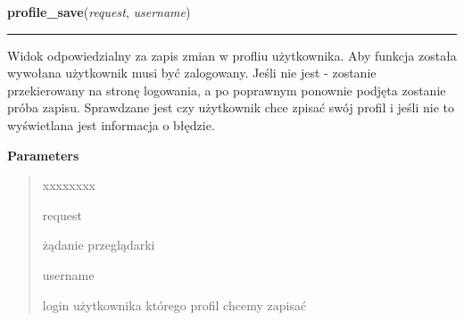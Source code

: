 \hspace{.8\funcindent}\begin{boxedminipage}{\funcwidth}

    \raggedright \textbf{profile\_save}(\textit{request}, \textit{username})

    \vspace{-1.5ex}

    \rule{\textwidth}{0.5\fboxrule}
\setlength{\parskip}{2ex}
    Widok odpowiedzialny za zapis zmian w profliu użytkownika. Aby funkcja 
    została wywołana użytkownik musi być zalogowany. Jeśli nie jest - 
    zostanie przekierowany na stronę logowania, a po poprawnym ponownie 
    podjęta zostanie próba zapisu. Sprawdzane jest czy użytkownik chce 
    zpisać swój profil i jeśli nie to wyświetlana jest informacja o 
    błędzie.

\setlength{\parskip}{1ex}
      \textbf{Parameters}
      \vspace{-1ex}

      \begin{quote}
        \begin{Ventry}{xxxxxxxx}

          \item[request]

          żądanie przeglądarki

          \item[username]

          login użytkownika którego profil chcemy zapisać

        \end{Ventry}

      \end{quote}

    \end{boxedminipage}

    \label{ass8_portal:accounts:views:profile_delete}

    \vspace{0.5ex}

